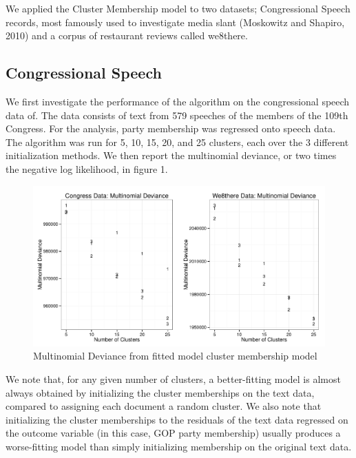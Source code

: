 \documentclass[12pt]{article}
\begin{document}
We applied the Cluster Membership model to two datasets; Congressional Speech records, most famously used to investigate media slant (Moskowitz and Shapiro, 2010) and a corpus of restaurant reviews called we8there.

\subsection{Congressional Speech} 

We first investigate the performance of the algorithm on the congressional speech data of. The data consists of text from 579 speeches of the members of the 109th Congress. For the analysis, party membership was regressed onto speech data. The algorithm was run for 5, 10, 15, 20, and 25 clusters, each over the 3 different initialization methods. We then report the multinomial deviance, or two times the negative log likelihood, in figure 1. 

\begin{figure}[!htpb]
  \centering
  \includegraphics[width=6.2in]{Images/mdev_both.pdf}
  \caption[Multinomial Deviance: Congress Data]
   {Multinomial Deviance from fitted model cluster membership model}
\end{figure}


We note that, for any given number of clusters, a better-fitting model is almost always obtained by initializing the cluster memberships on the text data, compared to assigning each document a random cluster.
We also note that initializing the cluster memberships to the residuals of the text data regressed on the outcome variable (in this case, GOP party membership) usually produces a worse-fitting model than simply initializing membership on the original text data.
\end{document}
